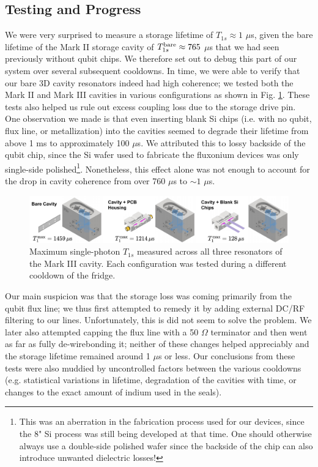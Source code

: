 \subsection{Testing and Progress}
We were very surprised to measure a storage lifetime of $T_{1s} \approx 1$ $\mu$s, given the bare lifetime of the Mark II storage cavity of $T_{1s}^{\rm bare} \approx 765$ $\mu$s that we had seen previously without qubit chips. We therefore set out to debug this part of our system over several subsequent cooldowns. In time, we were able to verify that our bare 3D cavity resonators indeed had high coherence; we tested both the Mark II and Mark III cavities in various configurations as shown in Fig. \ref{fig:4_3D_Cavity_Debugging}. These tests also helped us rule out excess coupling loss due to the storage drive pin. One observation we made is that even inserting blank Si chips (i.e. with no qubit, flux line, or metallization) into the cavities seemed to degrade their lifetime from above 1 ms to approximately 100 $\mu$s. We attributed this to lossy backside of the qubit chip, since the Si wafer used to fabricate the fluxonium devices was only single-side polished\footnote{This was an aberration in the fabrication process used for our devices, since the 8" Si process was still being developed at that time. One should otherwise always use a double-side polished wafer since the backside of the chip can also introduce unwanted dielectric losses!}. Nonetheless, this effect alone was not enough to account for the drop in cavity coherence from over 760 $\mu$s to $\sim\!1$ $\mu$s. 

\begin{figure}[t]
    \centering
    \includegraphics[width=\linewidth]{Figures/4/3D_Cavity_Debugging.pdf}
    \caption{Maximum single-photon $T_{1s}$ measured across all three resonators of the Mark III cavity. Each configuration was tested during a different cooldown of the fridge.}
    \label{fig:4_3D_Cavity_Debugging}
\end{figure}

Our main suspicion was that the storage loss was coming primarily from the qubit flux line; we thus first attempted to remedy it by adding external DC/RF filtering to our lines. Unfortunately, this is did not seem to solve the problem. We later also attempted capping the flux line with a 50 $\Omega$ terminator and then went as far as fully de-wirebonding it; neither of these changes helped appreciably and the storage lifetime remained around 1 $\mu$s or less. Our conclusions from these tests were also muddied by uncontrolled factors between the various cooldowns (e.g. statistical variations in lifetime, degradation of the cavities with time, or changes to the exact amount of indium used in the seals). 

